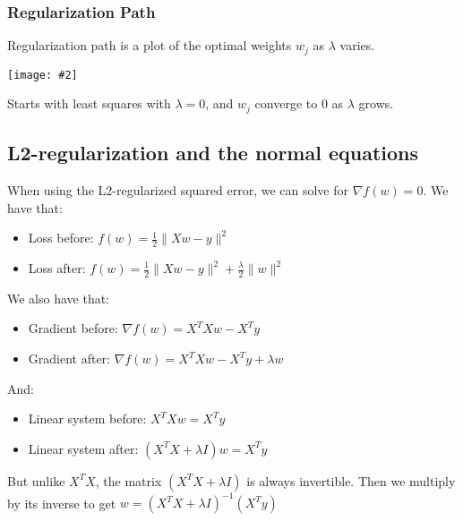 \documentclass{article}
\def\norm#1{\|#1\|}
\theoremstyle{definition}
\newcommand{\centerfig}[2]{\begin{center}\texttt{[image: \#2]}\end{center}}
\begin{document}
\subsubsection*{Regularization Path}
Regularization path is a plot of the optimal weights $ w_j $ as $\lambda$ varies.
\centerfig{0.5}{Reg-path}
Starts with least squares with $\lambda= 0$, and $ w_j $ converge to 0 as $\lambda$ grows.

\subsection*{L2-regularization and the normal equations}

When using the L2-regularized squared error, we can solve for $ \nabla f(w) = 0 $. We have that:
\begin{itemize}
	\item Loss before: $ f(w) = \frac{1}{2} \norm{Xw-y}^2 $
	\item Loss after: $ f(w) = \frac{1}{2} \norm{Xw-y}^2 + \frac{\lambda}{2} \norm{w}^2$
\end{itemize}
We also have that:
\begin{itemize}
	\item Gradient before: $ \nabla f(w) = X^T X w - X^Ty $
	\item Gradient after: $ \nabla f(w) = X^T X w - X^Ty + \lambda w$
\end{itemize}
And:
\begin{itemize}
	\item Linear system before: $ X^TXw = X^Ty $
	\item Linear system after: $ (X^TX + \lambda I )w = X^Ty $
\end{itemize}
But unlike $ X^TX $, the matrix $ (X^TX+ \lambda I) $ is always invertible. Then we multiply by its inverse to get $ w = (X^TX + \lambda I )^{-1} (X^Ty) $
\end{document}
